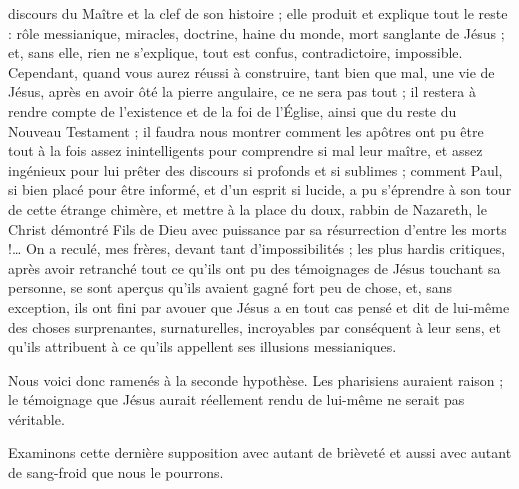 discours du Maître et la clef de son histoire ; elle produit et explique tout le reste : rôle messianique, miracles, doctrine, haine du monde, mort sanglante de Jésus ; et, sans elle, rien ne s’explique, tout est confus, contradictoire, impossible. Cependant, quand vous aurez réussi à construire, tant bien que mal, une vie de Jésus, après en avoir ôté la pierre angulaire, ce ne sera pas tout ; il restera à rendre compte de l’existence et de la foi de l’Église, ainsi que du reste du Nouveau Testament ; il faudra nous montrer comment les apôtres ont pu être tout à la fois assez inintelligents pour comprendre si mal leur maître, et assez ingénieux pour lui prêter des discours si profonds et si sublimes ; comment Paul, si bien placé pour être informé, et d’un esprit si lucide, a pu s’éprendre à son tour de cette étrange chimère, et mettre à la place du doux, rabbin de Nazareth, le Christ démontré Fils de Dieu avec puissance par sa résurrection d’entre les morts !… On a reculé, mes frères, devant tant d’impossibilités ; les plus hardis critiques, après avoir retranché tout ce qu’ils ont pu des témoignages de Jésus touchant sa personne, se sont aperçus qu’ils avaient gagné fort peu de chose, et, sans exception, ils ont fini par avouer que Jésus a en tout cas pensé et dit de lui-même des choses surprenantes, surnaturelles, incroyables par conséquent à leur sens, et qu’ils attribuent à ce qu’ils appellent ses illusions messianiques.

Nous voici donc ramenés à la seconde hypothèse. Les pharisiens auraient raison ; le témoignage que Jésus aurait réellement rendu de lui-même ne serait pas véritable.

Examinons cette dernière supposition avec autant de brièveté et aussi avec autant de sang-froid que nous le pourrons.

